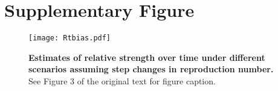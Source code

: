 \documentclass[12pt]{article}
\begin{document}
\pagebreak

\section*{Supplementary Figure}

\setcounter{figure}{0}    
\renewcommand\thefigure{S\arabic{figure}}    

\begin{figure}[!pht]
\begin{center}
\texttt{[image: Rtbias.pdf]}
\caption{
\textbf{Estimates of relative strength over time under different scenarios assuming step changes in reproduction number.}
See Figure 3 of the original text for figure caption.
}
\end{center}
\end{figure}


\pagebreak


\end{document}

